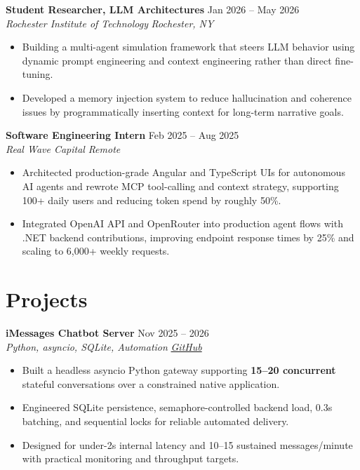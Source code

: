 \documentclass[10pt,letterpaper]{article}
\newif\ifresumeFirstRole
\newcommand{\resumeRole}[4]{%
  \ifresumeFirstRole
    \global\resumeFirstRolefalse
  \else
    \vspace{0pt plus 1fill}%
  \fi
  \textbf{#1} \hfill #2\\
  \textit{#3} \hfill \textit{#4}
}
\begin{document}
\resumeRole{Student Researcher, LLM Architectures}{Jan 2026 -- May 2026}{Rochester Institute of Technology}{Rochester, NY}
\begin{itemize}
  \item Building a multi-agent simulation framework that steers LLM behavior using dynamic prompt engineering and context engineering rather than direct fine-tuning.
  \item Developed a memory injection system to reduce hallucination and coherence issues by programmatically inserting context for long-term narrative goals.
\end{itemize}

\resumeRole{Software Engineering Intern}{Feb 2025 -- Aug 2025}{Real Wave Capital}{Remote}
\begin{itemize}
  \item Architected production-grade Angular and TypeScript UIs for autonomous AI agents and rewrote MCP tool-calling and context strategy, supporting 100+ daily users and reducing token spend by roughly 50\%.
  \item Integrated OpenAI API and OpenRouter into production agent flows with .NET backend contributions, improving endpoint response times by 25\% and scaling to 6,000+ weekly requests.
\end{itemize}

\section*{Projects}
\resumeRole{iMessages Chatbot Server}{Nov 2025 -- 2026}{Python, asyncio, SQLite, Automation}{\href{https://github.com/alextyhwang/iMessages-Chatbot-Server}{GitHub}}
\begin{itemize}
  \item Built a headless asyncio Python gateway supporting \textbf{15--20 concurrent} stateful conversations over a constrained native application.
  \item Engineered SQLite persistence, semaphore-controlled backend load, 0.3s batching, and sequential locks for reliable automated delivery.
  \item Designed for under-2s internal latency and 10--15 sustained messages/minute with practical monitoring and throughput targets.
\end{itemize}
\end{document}

